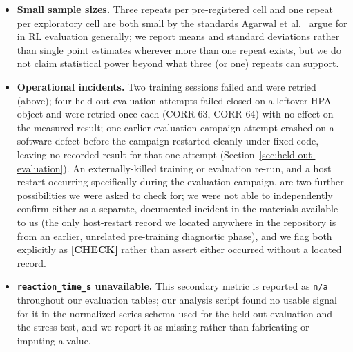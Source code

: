 \begin{itemize}[nosep]
    with the benchmark application for the Minikube node's limited CPU and
    memory, or add confounding load during a measured run. This means no
    live Grafana dashboard was available to monitor runs visually during
    either campaign; all telemetry used for analysis came directly from
    Prometheus, not from Grafana.
  \item \textbf{Small sample sizes.} Three repeats per pre-registered cell
    and one repeat per exploratory cell are both small by the standards
    Agarwal et al.\ \cite{agarwal2021precipice} argue for in RL evaluation
    generally; we report means and standard deviations rather than single
    point estimates wherever more than one repeat exists, but we do not
    claim statistical power beyond what three (or one) repeats can
    support.
  \item \textbf{Operational incidents.} Two training sessions failed and
    were retried (above); four held-out-evaluation attempts failed closed
    on a leftover HPA object and were retried once each (CORR-63, CORR-64)
    with no effect on the measured result; one earlier evaluation-campaign
    attempt crashed on a software defect before the campaign restarted
    cleanly under fixed code, leaving no recorded result for that one
    attempt (Section~\ref{sec:held-out-evaluation}). An externally-killed
    training or evaluation re-run, and a host restart occurring
    specifically during the evaluation campaign, are two further
    possibilities we were asked to check for; we were not able to
    independently confirm either as a separate, documented incident in the
    materials available to us (the only host-restart record we located
    anywhere in the repository is from an earlier, unrelated pre-training
    diagnostic phase), and we flag both explicitly as \textbf{[CHECK]}
    rather than assert either occurred without a located record.
  \item \textbf{\texttt{reaction\_\allowbreak time\_\allowbreak s} unavailable.} This secondary
    metric is reported as \texttt{n/\allowbreak \allowbreak a} throughout our evaluation tables;
    our analysis script found no usable signal for it in the normalized
    series schema used for the held-out evaluation and the stress test,
    and we report it as missing rather than fabricating or imputing a
    value.
\end{itemize}
